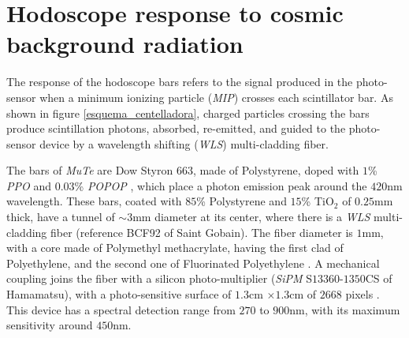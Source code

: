 \documentclass[submitting]{nst}
\begin{document}
\section{Hodoscope response to cosmic background radiation}\label{sec:hodoscope-response}
The response of the hodoscope bars refers to the signal produced in the photo-sensor when a minimum ionizing particle (\textsl{MIP}) crosses each scintillator bar. As shown in figure \ref{esquema_centelladora}, charged particles crossing the bars produce scintillation photons, absorbed, re-emitted, and guided to the photo-sensor device by a wavelength shifting (\textsl{WLS}) multi-cladding fiber. 

The bars of \textsl{MuTe} are Dow Styron $663$, made of Polystyrene, doped with $1$\% \textsl{PPO} and $0.03$\% \textsl{POPOP} \cite{PlaBrossRykalin2003}, which place a photon emission peak around the $420$nm wavelength. These bars, coated with $85$\% Polystyrene and $15$\% TiO$_2$ of $0.25$mm thick, have a tunnel of $\sim 3$mm diameter at its center, where there is a \textsl{WLS} multi-cladding fiber (reference BCF92 of Saint Gobain). The fiber diameter is $1$mm, with a core made of Polymethyl methacrylate, having the first clad of Polyethylene, and the second one of Fluorinated Polyethylene \cite{SaintGobain2017}. A mechanical coupling joins the fiber with a silicon photo-multiplier (\textsl{SiPM} S$13360$-$1350$CS of Hamamatsu), with a photo-sensitive surface of $1.3$cm $\times 1.3$cm of $2668$ pixels \cite{Hamamatsu2018}. This device has a spectral detection range from $270$ to $900$nm, with its maximum sensitivity around $450$nm.
\end{document}
